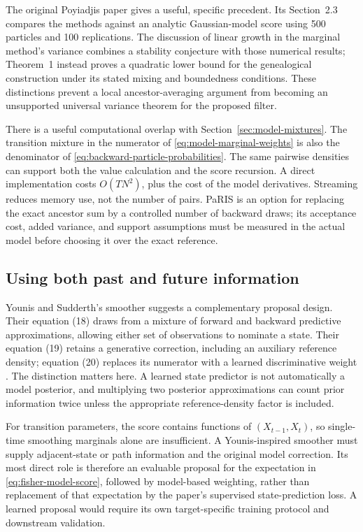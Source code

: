 \documentclass[11pt]{article}
\begin{document}
The original Poyiadjis paper gives a useful, specific precedent. Its
Section~2.3 compares the methods against an analytic Gaussian-model score
using 500 particles and 100 replications. The discussion of linear growth in
the marginal method's variance combines a stability conjecture with those
numerical results; Theorem~1 instead proves a quadratic lower bound for the
genealogical construction under its stated mixing and boundedness conditions.
These distinctions prevent a local ancestor-averaging argument from becoming
an unsupported universal variance theorem for the proposed filter.

There is a useful computational overlap with
Section~\ref{sec:model-mixtures}. The transition mixture in the numerator
of \eqref{eq:model-marginal-weights} is also the denominator of
\eqref{eq:backward-particle-probabilities}. The same pairwise densities can
support both the value calculation and the score recursion. A direct
implementation costs $O(TN^2)$, plus the cost of the model derivatives.
Streaming reduces memory use, not the number of pairs. PaRIS is an option
for replacing the exact ancestor sum by a controlled number of backward
draws; its acceptance cost, added variance, and support assumptions must be
measured in the actual model before choosing it over the exact reference.

\subsection{Using both past and future information}

Younis and Sudderth's smoother suggests a complementary proposal design.
Their equation (18) draws from a mixture of forward and backward predictive
approximations, allowing either set of observations to nominate a state.
Their equation (19) retains a generative correction, including an auxiliary
reference density; equation (20) replaces its numerator with a learned
discriminative weight \citep[Section 4]{younis2024}. The distinction matters
here. A learned state predictor is not automatically a model posterior, and
multiplying two posterior approximations can count prior information twice
unless the appropriate reference-density factor is included.

For transition parameters, the score contains functions of
$(X_{t-1},X_t)$, so single-time smoothing marginals alone are insufficient.
A Younis-inspired smoother must supply adjacent-state or path information
and the original model correction. Its most direct role is therefore an
evaluable proposal for the expectation in \eqref{eq:fisher-model-score},
followed by model-based weighting, rather than replacement of that expectation
by the paper's supervised state-prediction loss. A learned proposal would
require its own target-specific training protocol and downstream validation.
\end{document}
